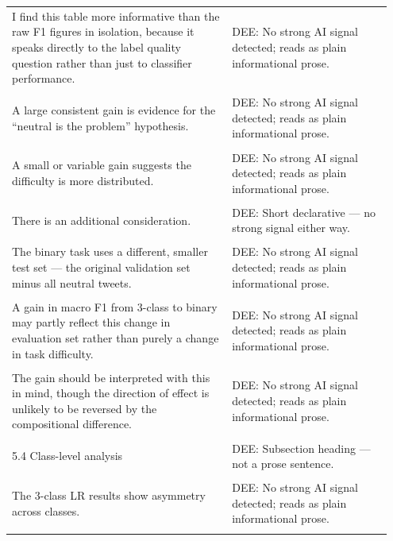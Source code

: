 \documentclass[11pt]{article}
\begin{document}
\begin{longtable}{|p{0.55\linewidth}|p{0.40\linewidth}|}
\hline
\rule{0pt}{3.5cm} & \\
\hline
I find this table more informative than the raw F1 figures in isolation, because it speaks directly to the label quality question rather than just to classifier performance. & DEE: No strong AI signal detected; reads as plain informational prose. \\[2pt]
\hline
\rule{0pt}{3.5cm} & \\
\hline
A large consistent gain is evidence for the ``neutral is the problem'' hypothesis. & DEE: No strong AI signal detected; reads as plain informational prose. \\[2pt]
\hline
\rule{0pt}{3.5cm} & \\
\hline
A small or variable gain suggests the difficulty is more distributed. & DEE: No strong AI signal detected; reads as plain informational prose. \\[2pt]
\hline
\rule{0pt}{3.5cm} & \\
\hline
There is an additional consideration. & DEE: Short declarative --- no strong signal either way. \\[2pt]
\hline
\rule{0pt}{3.5cm} & \\
\hline
The binary task uses a different, smaller test set --- the original validation set minus all neutral tweets. & DEE: No strong AI signal detected; reads as plain informational prose. \\[2pt]
\hline
\rule{0pt}{3.5cm} & \\
\hline
A gain in macro F1 from 3-class to binary may partly reflect this change in evaluation set rather than purely a change in task difficulty. & DEE: No strong AI signal detected; reads as plain informational prose. \\[2pt]
\hline
\rule{0pt}{3.5cm} & \\
\hline
The gain should be interpreted with this in mind, though the direction of effect is unlikely to be reversed by the compositional difference. & DEE: No strong AI signal detected; reads as plain informational prose. \\[2pt]
\hline
\rule{0pt}{3.5cm} & \\
\hline
5.4 Class-level analysis & DEE: Subsection heading --- not a prose sentence. \\[2pt]
\hline
\rule{0pt}{3.5cm} & \\
\hline
The 3-class LR results show asymmetry across classes. & DEE: No strong AI signal detected; reads as plain informational prose. \\[2pt]
\hline
\rule{0pt}{3.5cm} & \\

\end{longtable}
\end{document}
